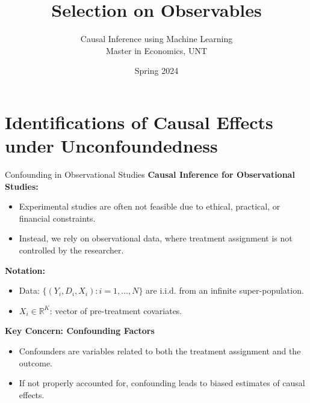 \documentclass[xcolor=svgnames,t]{beamer}
\title[Selection on Observables]{Selection on Observables}
\subtitle{}
\author[CIML ]{Causal Inference using Machine Learning\\ Master in Economics, UNT}
\institute[]{Andres Mena}
\date{Spring 2024}
\begin{document}
\begin{frame}
\maketitle
\end{frame}



\section{Identifications of Causal Effects under Unconfoundedness}

\begin{frame}{Confounding in Observational Studies}
\textbf{Causal Inference for Observational Studies:} 
\begin{itemize}
    \item Experimental studies are often not feasible due to ethical, practical, or financial constraints.
    \item Instead, we rely on observational data, where treatment assignment is not controlled by the researcher.
\end{itemize}

\textbf{Notation:}
\begin{itemize}
    \item Data: $\{(Y_i, D_i, X_i) : i=1,\dots,N\}$ are i.i.d. from an infinite super-population.
    \item $X_i \in \mathbb{R}^K$: vector of pre-treatment covariates.
\end{itemize}

\textbf{Key Concern: Confounding Factors}
\begin{itemize}
    \item \alert{Confounders} are variables related to both the treatment assignment and the outcome.
    \item If not properly accounted for, confounding leads to biased estimates of causal effects.
\end{itemize}
\end{frame}
\end{document}
